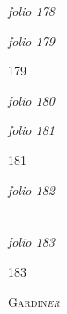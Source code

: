 \documentclass[12pt, a4paper]{book}
\begin{document}
\dotfill
						\newpage
{}

\textit{folio 178}


         \vspace*{4cm}
         
\dotfill
						

\textit{folio 179}


\begin{flushright}{\color{Mahogany}179}\end{flushright}

\dotfill
						\newpage
{}

\textit{folio 180}


         \vspace*{4cm}
         
\dotfill
						

\textit{folio 181}


\begin{flushright}{\color{Mahogany}181}\end{flushright}

\dotfill
						\newpage
{}

\textit{folio 182}


         \vspace*{4cm}
         
\dotfill
						  \section*{}  \subsection*{}

\textit{folio 183}



\begin{flushright}{\color{Mahogany}183}\end{flushright}
            		
				
				\marginpar[\vspace{0.5cm}{\textcolor{Gray}{C.}}]{}
			
            		
            		
            			
				\begin{center} \begin{large} {\scshape Gardin\textit{er}} \end{large} \end{center}
			
\end{document}
